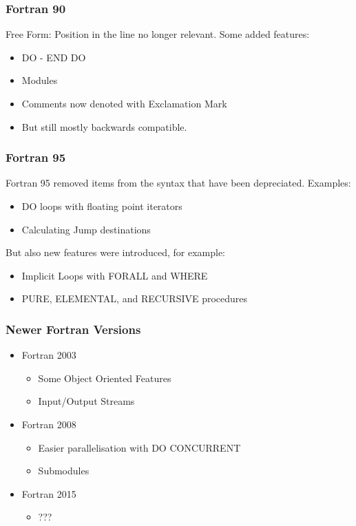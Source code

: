 \begin{frame}
  \frametitle{Fortran 90}
  Free Form: Position in the line no longer relevant.
  Some added features:
  \begin{itemize}
    \item DO - END DO
    \item Modules
    \item Comments now denoted with Exclamation Mark
    \item But still mostly backwards compatible.
  \end{itemize}
\end{frame}

\begin{frame}
  \frametitle{Fortran 95}
  Fortran 95 removed items from the syntax that have been depreciated.
  Examples:
  \begin{itemize}
    \item DO loops with floating point iterators
    \item Calculating Jump destinations
  \end{itemize}
  But also new features were introduced, for example:
  \begin{itemize}
    \item Implicit Loops with FORALL and WHERE
    \item PURE, ELEMENTAL, and RECURSIVE procedures
  \end{itemize}
\end{frame}

\begin{frame}
  \frametitle{Newer Fortran Versions}
  \begin{itemize}
    \item Fortran 2003
    \begin{itemize}
      \item Some Object Oriented Features
      \item Input/Output Streams
    \end{itemize}
    \item Fortran 2008
    \begin{itemize}
      \item Easier parallelisation with DO CONCURRENT
      \item Submodules
    \end{itemize}
    \item Fortran 2015
    \begin{itemize}
      \item ???
    \end{itemize}
  \end{itemize}
\end{frame}

